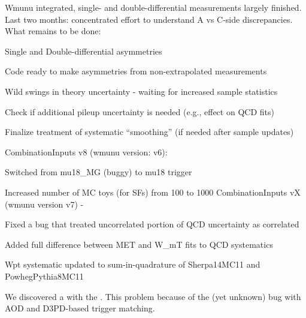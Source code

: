 

{
Wmunu integrated, single- and double-differential measurements largely finished.\\
Last two months: concentrated effort to understand A vs C-side discrepancies. \\

What remains to be done:
\iteb
\item Single and Double-differential asymmetries
\iteb
\item Code ready to make asymmetries from non-extrapolated measurements
\item Wild swings in theory uncertainty - waiting for increased sample statistics
\itee
\item Check if additional pileup uncertainty is needed (e.g., effect on QCD fits)
\item Finalize treatment of systematic ``smoothing'' (if needed after sample updates)
\itee
}

{
CombinationInputs v8 (wmunu version: v6):
\iteb
\item Switched from mu18\_MG (buggy) to mu18 trigger
\item Increased number of MC toys (for SFs) from 100 to 1000
\itee
CombinationInputs vX (wmunu version v7) - 
\iteb
\item Fixed a bug that treated uncorrelated portion of QCD uncertainty as correlated
\item Added full difference between MET and W\_mT fits to QCD systematics
\item Wpt systematic updated to sum-in-quadrature of Sherpa14MC11 and PowhegPythia8MC11
\itee
}

{
  We discovered a  with the . This problem  because of the (yet unknown) bug with AOD and D3PD-based trigger matching. 
}

